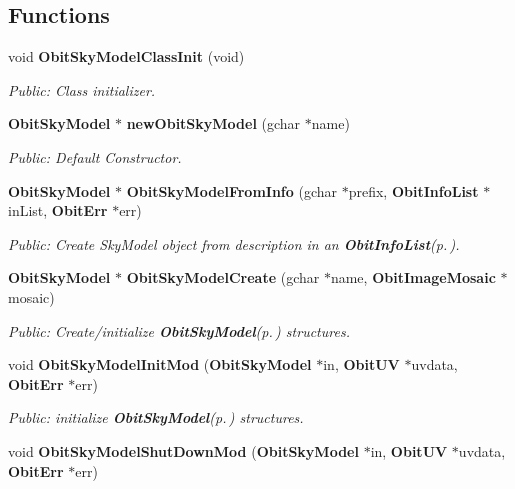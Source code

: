 \subsection*{Functions}
\begin{CompactItemize}
\item 
void {\bf Obit\-Sky\-Model\-Class\-Init} (void)
\begin{CompactList}\small\item\em Public: Class initializer. \item\end{CompactList}\item 
{\bf Obit\-Sky\-Model} $\ast$ {\bf new\-Obit\-Sky\-Model} (gchar $\ast$name)
\begin{CompactList}\small\item\em Public: Default Constructor. \item\end{CompactList}\item 
{\bf Obit\-Sky\-Model} $\ast$ {\bf Obit\-Sky\-Model\-From\-Info} (gchar $\ast$prefix, {\bf Obit\-Info\-List} $\ast$in\-List, {\bf Obit\-Err} $\ast$err)
\begin{CompactList}\small\item\em Public: Create Sky\-Model object from description in an {\bf Obit\-Info\-List}{\rm (p.\,\pageref{structObitInfoList})}. \item\end{CompactList}\item 
{\bf Obit\-Sky\-Model} $\ast$ {\bf Obit\-Sky\-Model\-Create} (gchar $\ast$name, {\bf Obit\-Image\-Mosaic} $\ast$mosaic)
\begin{CompactList}\small\item\em Public: Create/initialize {\bf Obit\-Sky\-Model}{\rm (p.\,\pageref{structObitSkyModel})} structures. \item\end{CompactList}\item 
void {\bf Obit\-Sky\-Model\-Init\-Mod} ({\bf Obit\-Sky\-Model} $\ast$in, {\bf Obit\-UV} $\ast$uvdata, {\bf Obit\-Err} $\ast$err)
\begin{CompactList}\small\item\em Public: initialize {\bf Obit\-Sky\-Model}{\rm (p.\,\pageref{structObitSkyModel})} structures. \item\end{CompactList}\item 
void {\bf Obit\-Sky\-Model\-Shut\-Down\-Mod} ({\bf Obit\-Sky\-Model} $\ast$in, {\bf Obit\-UV} $\ast$uvdata, {\bf Obit\-Err} $\ast$err)

\end{CompactItemize}
